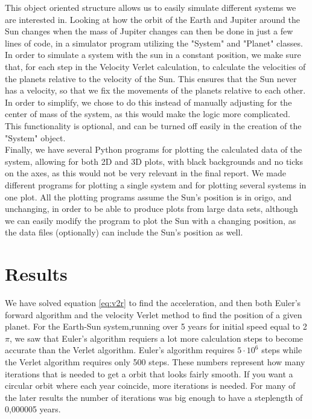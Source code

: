 \documentclass{article}
\begin{document}
        This object oriented structure allows us to easily simulate different systems we are interested in. Looking at how the orbit of the Earth and Jupiter around the Sun changes when the mass of Jupiter changes can then be done in just a few lines of code, in a simulator program utilizing the "System" and "Planet" classes.\\

        In order to simulate a system with the sun in a constant position, we make sure that, for each step in the Velocity Verlet calculation, to calculate the velocities of the planets relative to the velocity of the Sun. This ensures that the Sun never has a velocity, so that we fix the movements of the planets relative to each other. In order to simplify, we chose to do this instead of manually adjusting for the center of mass of the system, as this would make the logic more complicated. This functionality is optional, and can be turned off easily in the creation of the "System" object.\\

        Finally, we have several Python programs for plotting the calculated data of the system, allowing for both 2D and 3D plots, with black backgrounds and no ticks on the axes, as this would not be very relevant in the final report. We made different programs for plotting a single system and for plotting several systems in one plot. All the plotting programs assume the Sun's position is in origo, and unchanging, in order to be able to produce plots from large data sets, although we can easily modify the program to plot the Sun with a changing position, as the data files (optionally) can include the Sun's position as well.


\section{Results}
    We have solved equation \ref{eq:v2r} to find the acceleration, and then both Euler's forward algorithm and the velocity Verlet method to find the position of a given planet. For the Earth-Sun system,running over 5 years for initial speed equal to 2$\pi$, we saw that Euler's algorithm requiers a lot more calculation steps to become accurate than the Verlet algorithm. Euler's algorithm requires $5 \cdot 10^6$ steps while the Verlet algorithm requires only 500 steps. These numbers represent how many iterations that is needed to get a orbit that looks fairly smooth. If you want a circular orbit where each year coincide, more iterations is needed. For many of the later results the number of iterations was big enough to have a steplength of 0,000005 years.\\
\end{document}
